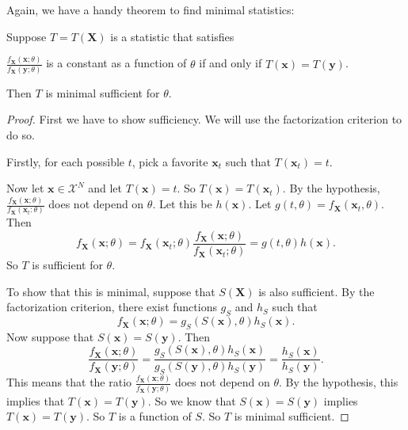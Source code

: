 \documentclass[a4paper]{article}
\begin{document}
Again, we have a handy theorem to find minimal statistics:
\begin{thm}
  Suppose $T = T(\mathbf{X})$ is a statistic that satisfies
  \begin{center}
    $\displaystyle\frac{f_\mathbf{X}(\mathbf{x}; \theta)}{f_\mathbf{X}(\mathbf{y}; \theta)}$ is a constant as a function of $\theta$ if and only if $T(\mathbf{x}) = T(\mathbf{y})$.
  \end{center}
  Then $T$ is minimal sufficient for $\theta$.
\end{thm}
\begin{proof}
  First we have to show sufficiency. We will use the factorization criterion to do so.

  Firstly, for each possible $t$, pick a favorite $\mathbf{x}_t$ such that $T(\mathbf{x}_t) = t$.

  Now let $\mathbf{x}\in \mathcal{X}^N$ and let $T(\mathbf{x}) = t$. So $T(\mathbf{x}) = T(\mathbf{x}_t)$. By the hypothesis, $\frac{f_\mathbf{X}(\mathbf{x}; \theta)}{f_\mathbf{X}(\mathbf{x}_t: \theta)}$ does not depend on $\theta$. Let this be $h(\mathbf{x})$. Let $g(t, \theta) = f_\mathbf{X}(\mathbf{x}_t, \theta)$. Then
  \[
    f_\mathbf{X}(\mathbf{x}; \theta) = f_\mathbf{X}(\mathbf{x}_t; \theta) \frac{f_\mathbf{X}(\mathbf{x}; \theta)}{f_\mathbf{X}(\mathbf{x}_t; \theta)} = g(t, \theta) h(\mathbf{x}).
  \]
  So $T$ is sufficient for $\theta$.

  To show that this is minimal, suppose that $S(\mathbf{X})$ is also sufficient. By the factorization criterion, there exist functions $g_S$ and $h_S$ such that
  \[
    f_\mathbf{X}(\mathbf{x}; \theta) = g_S(S(\mathbf{x}), \theta) h_S(\mathbf{x}).
  \]
  Now suppose that $S(\mathbf{x}) = S(\mathbf{y})$. Then
  \[
    \frac{f_\mathbf{X}(\mathbf{x}; \theta)}{f_\mathbf{X}(\mathbf{y}; \theta)} = \frac{g_S(S(\mathbf{x}), \theta)h_S(\mathbf{x})}{g_S(S(\mathbf{y}), \theta)h_S(\mathbf{y})} = \frac{h_S(\mathbf{x})}{h_S(\mathbf{y})}.
  \]
  This means that the ratio $\frac{f_\mathbf{X}(\mathbf{x}; \theta)}{f_\mathbf{X}(\mathbf{y}; \theta)}$ does not depend on $\theta$. By the hypothesis, this implies that $T(\mathbf{x}) = T(\mathbf{y})$. So we know that $S(\mathbf{x}) = S(\mathbf{y})$ implies $T(\mathbf{x}) = T(\mathbf{y})$. So $T$ is a function of $S$. So $T$ is minimal sufficient.
\end{proof}
\end{document}
